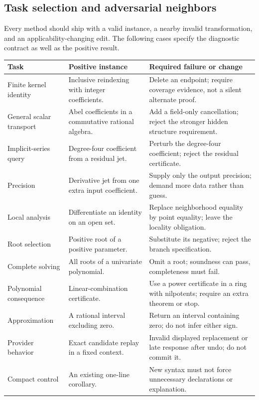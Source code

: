 \documentclass[11pt,a4paper]{article}
\theoremstyle{definition}
\begin{document}
\subsection{Task selection and adversarial neighbors}
Every method should ship with a valid instance, a nearby invalid transformation, and an applicability-changing edit. The following cases specify the diagnostic contract as well as the positive result.
\begin{longtable}{@{}P{.22\textwidth}P{.34\textwidth}P{.36\textwidth}@{}}
\toprule
Task & Positive instance & Required failure or change\\
\midrule
\endhead
Finite kernel identity & Inclusive reindexing with integer coefficients. & Delete an endpoint; require coverage evidence, not a silent alternate proof.\\
General scalar transport & Abel coefficients in a commutative rational algebra. & Add a field-only cancellation; reject the stronger hidden structure requirement.\\
Implicit-series query & Degree-four coefficient from a residual jet. & Perturb the degree-four coefficient; reject the residual certificate.\\
Precision & Derivative jet from one extra input coefficient. & Supply only the output precision; demand more data rather than guess.\\
Local analysis & Differentiate an identity on an open set. & Replace neighborhood equality by point equality; leave the locality obligation.\\
Root selection & Positive root of a positive parameter. & Substitute its negative; reject the branch specification.\\
Complete solving & All roots of a univariate polynomial. & Omit a root; soundness can pass, completeness must fail.\\
Polynomial consequence & Linear-combination certificate. & Use a power certificate in a ring with nilpotents; require an extra theorem or stop.\\
Approximation & A rational interval excluding zero. & Return an interval containing zero; do not infer either sign.\\
Provider behavior & Exact candidate replay in a fixed context. & Invalid displayed replacement or late response after undo; do not commit it.\\
Compact control & An existing one-line corollary. & New syntax must not force unnecessary declarations or explanation.\\
\bottomrule
\end{longtable}
\end{document}
